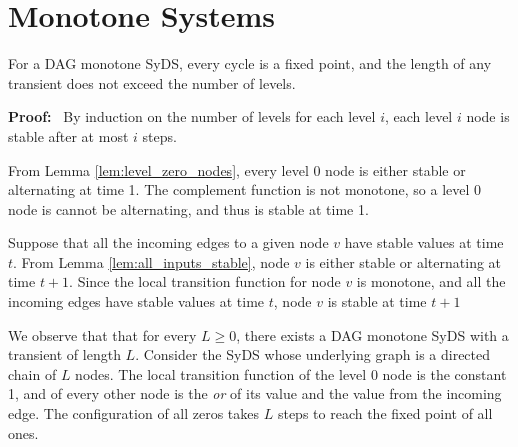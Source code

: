 \section{Monotone Systems}
\label{sec:monotoner_functions}

\begin{theorem}\label{thm:montone_stable}
For a DAG monotone SyDS, every cycle is a fixed point, 
and the length of any transient does not exceed the number of levels.
\end{theorem}
\noindent
\textbf{Proof:}~ 
By induction on the number of levels for each level $i$, 
each level $i$ node is stable after at most $i$ steps.

From Lemma \ref{lem:level_zero_nodes}, every level 0 node is either stable or alternating  at time 1.
The complement function is not monotone, so a  level 0 node is cannot be alternating,
and thus is stable at time 1.

Suppose that all the incoming edges to a given node $v$ have stable values at time $t$.
From Lemma \ref{lem:all_inputs_stable}, node $v$ is either stable or alternating  at time $t+1$.
Since the local transition function for node $v$ is monotone, 
and all the incoming edges have stable values at time $t$, node $v$ is stable at time $t+1$
\QED

We observe that that for every $L \geq 0$, there exists a DAG monotone SyDS with 
a transient of length $L$. 
Consider the SyDS whose underlying graph is a directed chain of $L$ nodes.
The local transition function of the level 0 node is the constant 1,
and of every other node is the {\em or} of its value and the value from the incoming edge.
The configuration of all zeros takes $L$ steps to reach the fixed point of all ones.
